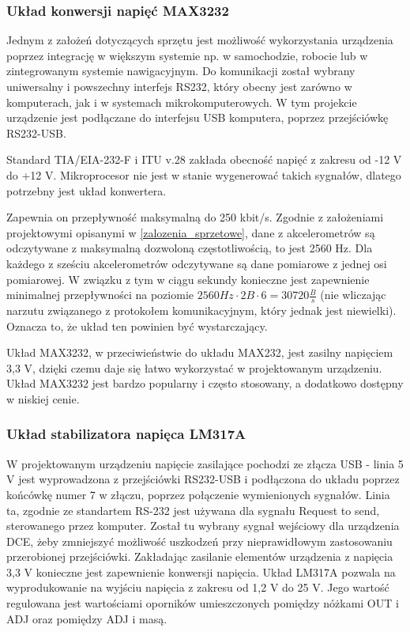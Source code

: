\subsubsection{Układ konwersji napięć MAX3232}
Jednym z założeń dotyczących sprzętu jest możliwość wykorzystania urządzenia poprzez integrację w większym systemie np. w samochodzie, robocie lub w zintegrowanym systemie nawigacyjnym. Do komunikacji został wybrany uniwersalny i powszechny interfejs RS232, który obecny jest zarówno w komputerach, jak i w systemach mikrokomputerowych. W tym projekcie urządzenie jest podłączane do interfejsu USB komputera, poprzez przejściówkę RS232-USB.

Standard TIA/EIA-232-F i ITU v.28 zakłada obecność napięć z zakresu od -12 V do +12 V. Mikroprocesor nie jest w stanie wygenerować takich sygnałów, dlatego potrzebny jest układ konwertera. 

Zapewnia on przepływność maksymalną do 250 kbit/s. Zgodnie z założeniami projektowymi opisanymi w \ref{zalozenia_sprzetowe}, dane z akcelerometrów są odczytywane z maksymalną dozwoloną częstotliwością, to jest 2560 Hz. Dla każdego z sześciu akcelerometrów odczytywane są dane pomiarowe z jednej osi pomiarowej. W związku z tym w ciągu sekundy konieczne jest zapewnienie minimalnej przepływności na poziomie $2560 Hz\cdot 2B \cdot 6 = 30720 \frac{B}{s}$ (nie wliczając narzutu związanego z protokołem komunikacyjnym, który jednak jest niewielki). Oznacza to, że układ ten powinien być wystarczający.

Układ MAX3232, w przeciwieństwie do układu MAX232, jest zasilny napięciem 3,3 V, dzięki czemu daje się łatwo wykorzystać w projektowanym urządzeniu. Układ MAX3232 jest bardzo popularny i często stosowany, a dodatkowo dostępny w niskiej cenie. 

\subsubsection{Układ stabilizatora napięca LM317A}
W projektowanym urządzeniu napięcie zasilające pochodzi ze złącza USB - linia 5 V jest wyprowadzona z przejściówki RS232-USB i podłączona do układu poprzez końcówkę numer 7 w złączu, poprzez połączenie wymienionych sygnałów. Linia ta, zgodnie ze standartem RS-232 jest używana dla sygnału Request to send, sterowanego przez komputer. Został tu wybrany sygnał wejściowy dla urządzenia DCE, żeby zmniejszyć możliwość uszkodzeń przy nieprawidłowym zastosowaniu przerobionej przejściówki. 
Zakładając zasilanie elementów urządzenia z napięcia 3,3 V konieczne jest zapewnienie konwersji napięcia. Układ LM317A pozwala na wyprodukowanie na wyjściu napięcia z zakresu od 1,2 V do 25 V. Jego wartość regulowana jest wartościami oporników umieszczonych pomiędzy nóżkami OUT i ADJ oraz pomiędzy ADJ i masą.

